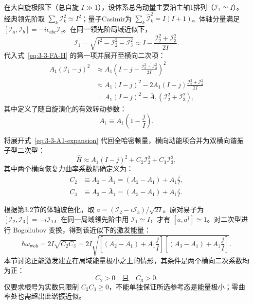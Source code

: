 在大自旋极限下（总自旋 $I \gg 1$），设体系总角动量主要沿主轴1排列（$\mathcal I_1\simeq I$）。经典领先阶取 $\sum_k\mathcal I_k^2\simeq I^2$；量子Casimir为 $\sum_k\hat{\mathcal I}_k^2=I(I+1)$。体轴分量满足 $[\mathcal I_a,\mathcal I_b]=-i\epsilon_{abc}\mathcal I_c$。在同一领先阶局域近似下，
\begin{equation}\label{eq:3-3-I1-expansion}
\mathcal{I}_1 = \sqrt{I^2 - \mathcal{I}_2^2 - \mathcal{I}_3^2} \approx I - \frac{\mathcal{I}_2^2 + \mathcal{I}_3^2}{2I}.
\end{equation}
代入式~\eqref{eq:3-3-FA-H} 的第一项并展开至横向二次项：
\begin{align}
A_1 (\mathcal{I}_1 - j)^2 &\approx A_1 \left( I - j - \frac{\mathcal{I}_2^2 + \mathcal{I}_3^2}{2I} \right)^2 \nonumber \\
&\approx A_1 (I - j)^2 - 2 A_1 (I - j) \frac{\mathcal{I}_2^2 + \mathcal{I}_3^2}{2I} \nonumber \\
&= A_1 (I - j)^2 - \bar{A}_1 (\mathcal{I}_2^2 + \mathcal{I}_3^2), \label{eq:3-3-A1-expansion}
\end{align}
其中定义了随自旋演化的有效转动参数：
\begin{equation}\label{eq:3-3-A1-bar}
\bar{A}_1 \equiv A_1 \left( 1 - \frac{j}{I} \right).
\end{equation}

将展开式~\eqref{eq:3-3-A1-expansion} 代回全哈密顿量，横向动能项合并为双横向谐振子型二次型：
\begin{equation}\label{eq:3-3-transverse-H}
\hat{H} \approx A_1 (I - j)^2 + C_2 \mathcal{I}_2^2 + C_3 \mathcal{I}_3^2,
\end{equation}
其中两个横向恢复力曲率系数精确定义为：
\begin{align}
C_2 &\equiv A_2 - \bar{A}_1 = (A_2 - A_1) + A_1 \frac{j}{I}, \label{eq:3-3-C2-def} \\
C_3 &\equiv A_3 - \bar{A}_1 = (A_3 - A_1) + A_1 \frac{j}{I}. \label{eq:3-3-C3-def}
\end{align}

根据第3.2节的体轴玻色化，取 $a=(\mathcal I_2-i\mathcal I_3)/\sqrt{2I}$。原对易子为 $[\mathcal I_2,\mathcal I_3]=-i\mathcal I_1$，在同一局域领先阶中用 $\mathcal I_1\simeq I$，才有 $[a,a^\dagger]\simeq1$。对二次型进行 Bogoliubov 变换，得到该近似下的激发能量：
\begin{equation}\label{eq:3-3-wobbling-freq-FA}
\hbar \omega_{\text{wob}} = 2I \sqrt{C_2 C_3} = 2I \sqrt{\left[ (A_2 - A_1) + A_1 \frac{j}{I} \right] \left[ (A_3 - A_1) + A_1 \frac{j}{I} \right]}.
\end{equation}
本节讨论正能激发建立在局域能量极小之上的情形，其条件是两个横向二次系数均为正：
\begin{equation}\label{eq:3-3-stability-condition}
C_2 > 0 \quad \text{且} \quad C_3 > 0.
\end{equation}
仅要求根号为实数只限制 $C_2C_3\ge0$，不能单独保证所选参考态是能量极小；零曲率处也需超出此谐振近似。

